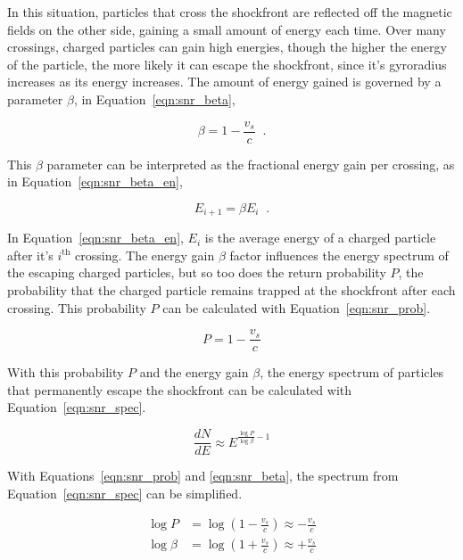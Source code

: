   In this situation, particles that cross the shockfront are reflected off the magnetic fields on the other side, gaining a small amount of energy each time.
  Over many crossings, charged particles can gain high energies, though the higher the energy of the particle, the more likely it can escape the shockfront, since it's gyroradius increases as its energy increases.
  The amount of energy gained is governed by a parameter $\beta$, in Equation~\ref{eqn:snr_beta}, 
  
  \begin{equation}\label{eqn:snr_beta}
    \beta = 1 - \frac{v_s}{c} \;\; .
  \end{equation}
  
  This $\beta$ parameter can be interpreted as the fractional energy gain per crossing, as in Equation~\ref{eqn:snr_beta_en},

  \begin{equation}\label{eqn:snr_beta_en}
    E_{i+1} = \beta E_{i} \;\; .
  \end{equation}
  
  In Equation~\ref{eqn:snr_beta_en}, $E_i$ is the average energy of a charged particle after it's $i^{\textrm{th}}$ crossing.
  The energy gain $\beta$ factor influences the energy spectrum of the escaping charged particles, but so too does the return probability $P$, the probability that the charged particle remains trapped at the shockfront after each crossing.
  This probability $P$ can be calculated with Equation~\ref{eqn:snr_prob}.
  
  \begin{equation}\label{eqn:snr_prob}
    P = 1 - \frac{v_s}{c}
  \end{equation}
  
  With this probability $P$ and the energy gain $\beta$, the energy spectrum of particles that permanently escape the shockfront can be calculated with Equation~\ref{eqn:snr_spec}.
  
  \begin{equation}\label{eqn:snr_spec}
    \frac{dN}{dE} \approx E^{ \frac{\log P}{\log \beta} - 1 }
  \end{equation}
  
  With Equations~\ref{eqn:snr_prob} and \ref{eqn:snr_beta}, the spectrum from Equation~\ref{eqn:snr_spec} can be simplified.

  \begin{equation}\label{eqn:snr_simplify}
    \begin{split}
       \log P     & = \log \left ( 1 - \frac{v_s}{c} \right ) \approx - \frac{v_s}{c} \\
       \log \beta & = \log \left ( 1 + \frac{v_s}{c} \right ) \approx + \frac{v_s}{c} \\
    \end{split}
  \end{equation}
  
